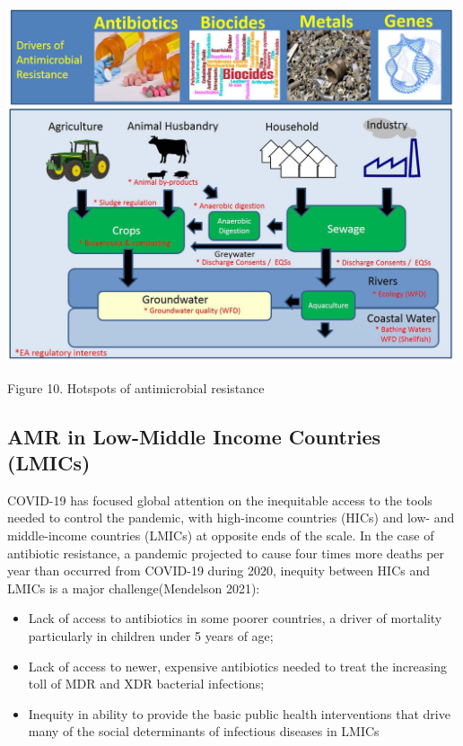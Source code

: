 \documentclass[]{tufte-handout}
\providecommand{\tightlist}{%
  \setlength{\itemsep}{0pt}\setlength{\parskip}{0pt}}
\begin{document}
\includegraphics[width=5.20833in,height=\textheight]{images/hotspots.png}

Figure 10. Hotspots of antimicrobial resistance

\hypertarget{amr-in-low-middle-income-countries-lmics}{%
\subsection*{AMR in Low-Middle Income Countries
(LMICs)}\label{amr-in-low-middle-income-countries-lmics}}

COVID-19 has focused global attention on the inequitable access to the
tools needed to control the pandemic, with high-income countries (HICs)
and low- and middle-income countries (LMICs) at opposite ends of the
scale. In the case of antibiotic resistance, a pandemic projected to
cause four times more deaths per year than occurred from COVID-19 during
2020, inequity between HICs and LMICs is a major challenge(Mendelson
2021):

\begin{itemize}
\tightlist
\item
  Lack of access to antibiotics in some poorer countries, a driver of
  mortality particularly in children under 5 years of age;
\item
  Lack of access to newer, expensive antibiotics needed to treat the
  increasing toll of MDR and XDR bacterial infections;
\item
  Inequity in ability to provide the basic public health interventions
  that drive many of the social determinants of infectious diseases in
  LMICs
\end{itemize}
\end{document}

